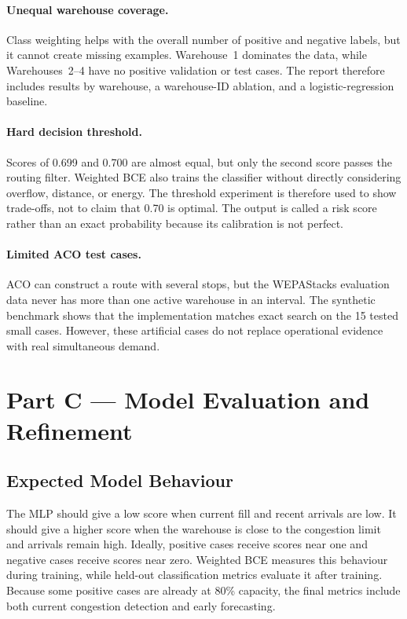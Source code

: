 \documentclass[10pt]{article}
\begin{document}
\paragraph{Unequal warehouse coverage.}
Class weighting helps with the overall number of positive and negative labels, but it cannot create missing examples. Warehouse~1 dominates the data, while Warehouses~2--4 have no positive validation or test cases. The report therefore includes results by warehouse, a warehouse-ID ablation, and a logistic-regression baseline.

\paragraph{Hard decision threshold.}
Scores of 0.699 and 0.700 are almost equal, but only the second score passes the routing filter. Weighted BCE also trains the classifier without directly considering overflow, distance, or energy. The threshold experiment is therefore used to show trade-offs, not to claim that 0.70 is optimal. The output is called a risk score rather than an exact probability because its calibration is not perfect.

\paragraph{Limited ACO test cases.}
ACO can construct a route with several stops, but the WEPAStacks evaluation data never has more than one active warehouse in an interval. The synthetic benchmark shows that the implementation matches exact search on the 15 tested small cases. However, these artificial cases do not replace operational evidence with real simultaneous demand.

\section{Part C --- Model Evaluation and Refinement}

\subsection{Expected Model Behaviour}

The MLP should give a low score when current fill and recent arrivals are low. It should give a higher score when the warehouse is close to the congestion limit and arrivals remain high. Ideally, positive cases receive scores near one and negative cases receive scores near zero. Weighted BCE measures this behaviour during training, while held-out classification metrics evaluate it after training. Because some positive cases are already at 80\% capacity, the final metrics include both current congestion detection and early forecasting.
\end{document}
